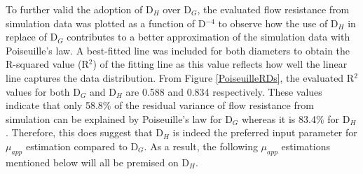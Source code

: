 \noindent To further valid the adoption of D$_{H}$ over D$_{G}$, the evaluated flow resistance from simulation data was plotted as a function of D$^{-4}$ to observe how the use of D$_{H}$ in replace of D$_{G}$ contributes to a better approximation of the simulation data with Poiseuille's law. A best-fitted line was included for both diameters to obtain the R-squared value (R$^{2}$) of the fitting line as this value reflects how well the linear line captures the data distribution. From Figure \ref{PoiseuilleRDs}, the evaluated R$^{2}$ values for both D$_{G}$ and D$_{H}$ are 0.588 and 0.834 respectively. These values indicate that only 58.8\% of the residual variance of flow resistance from simulation can be explained by Poiseuille's law for D$_{G}$ whereas it is 83.4\% for D$_{H}$. Therefore, this does suggest that D$_{H}$ is indeed the preferred input parameter for $\mu_{app}$ estimation compared to D$_{G}$. As a result, the following $\mu_{app}$ estimations mentioned below will all be premised on D$_{H}$. 